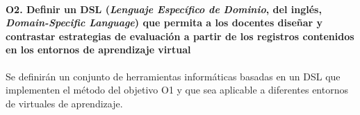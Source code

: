 \paragraph*{O2. Definir un DSL (\emph{Lenguaje Específico de Dominio}, del inglés, \emph{Domain-Specific Language}) que permita a los docentes diseñar y contrastar estrategias de evaluación a partir de los registros contenidos en los entornos de aprendizaje virtual}

Se definirán un conjunto de herramientas informáticas basadas en un DSL que implementen el método del objetivo O1 y que sea aplicable a diferentes entornos de virtuales de aprendizaje.









